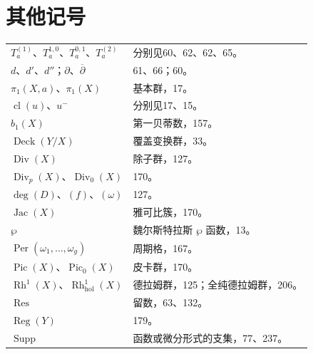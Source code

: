 \section*{其他记号}
\begin{longtable}{p{}p{}}
$T_a^{(1)}$、$T_a^{1,0}$、$T_a^{0,1}$、$T_a^{(2)}$ & 分别见60、62、62、65。\\
$d$、$d'$、$d''$；$\partial$、$\overline\partial$ & 61、66；60。\\
$\pi_1(X,a)$、$\pi_1(X)$ & 基本群，17。\\
$\operatorname{cl}(u)$、$u^-$ & 分别见17、15。\\
$b_1(X)$ & 第一贝蒂数，157。\\
$\operatorname{Deck}(Y/X)$ & 覆盖变换群，33。\\
$\operatorname{Div}(X)$ & 除子群，127。\\
$\operatorname{Div}_p(X)$、$\operatorname{Div}_0(X)$ & 170。\\
$\deg(D)$、$(f)$、$(\omega)$ & 127。\\
$\operatorname{Jac}(X)$ & 雅可比簇，170。\\
$\wp$ & 魏尔斯特拉斯 $\wp$ 函数，13。\\
$\operatorname{Per}(\omega_1,\ldots,\omega_g)$ & 周期格，167。\\
$\operatorname{Pic}(X)$、$\operatorname{Pic}_0(X)$ & 皮卡群，170。\\
$\operatorname{Rh}^1(X)$、$\operatorname{Rh}_{\mathrm{hol}}^1(X)$ & 德拉姆群，125；全纯德拉姆群，206。\\
$\operatorname{Res}$ & 留数，63、132。\\
$\operatorname{Reg}(Y)$ & 179。\\
$\operatorname{Supp}$ & 函数或微分形式的支集，77、237。\\
\end{longtable}
